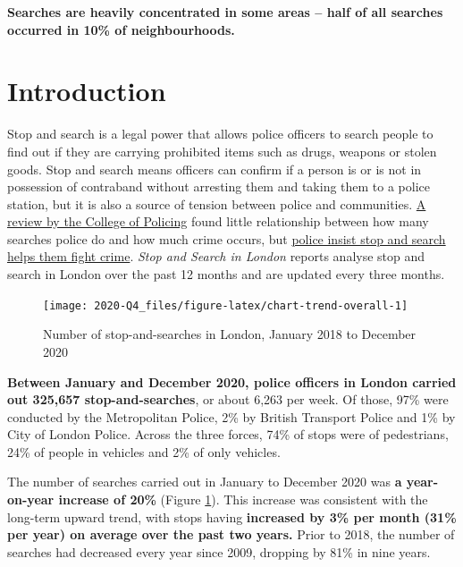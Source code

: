 \documentclass[
  a4paper,
  twoside, 11pt]{article}
\begin{document}
\textbf{\sffamily Searches are heavily concentrated in some areas -- half of all searches occurred in 10\% of neighbourhoods.}

\hypertarget{introduction}{%
\section{Introduction}\label{introduction}}

Stop and search is a legal power that allows police officers to search people to find out if they are carrying prohibited items such as drugs, weapons or stolen goods. Stop and search means officers can confirm if a person is or is not in possession of contraband without arresting them and taking them to a police station, but it is also a source of tension between police and communities. \href{https://whatworks.college.police.uk/Research/Documents/SS_and_crime_report.pdf}{A review by the College of Policing} found little relationship between how many searches police do and how much crime occurs, but \href{https://www.met.police.uk/advice/advice-and-information/st-s/stop-and-search/why-we-use-stop-and-search/}{police insist stop and search helps them fight crime}. \emph{Stop and Search in London} reports analyse stop and search in London over the past 12 months and are updated every three months.



\begin{figure}[bh]

{\centering \texttt{[image: 2020-Q4\_files/figure-latex/chart-trend-overall-1]} 

}

\caption{Number of stop-and-searches in London, January 2018 to December 2020}\label{fig:chart-trend-overall}
\end{figure}

\textbf{Between January and December 2020, police officers in London carried out 325,657 stop-and-searches}, or about 6,263 per week. Of those, 97\% were conducted by the Metropolitan Police, 2\% by British Transport Police and 1\% by City of London Police. Across the three forces, 74\% of stops were of pedestrians, 24\% of people in vehicles and 2\% of only vehicles.

The number of searches carried out in January to December 2020 was \textbf{a year-on-year increase of 20\%} (Figure \ref{fig:chart-trend-overall}). This increase was consistent with the long-term upward trend, with stops having \textbf{increased by 3\% per month (31\% per year) on average over the past two years.} Prior to 2018, the number of searches had decreased every year since 2009, dropping by 81\% in nine years.
\end{document}
